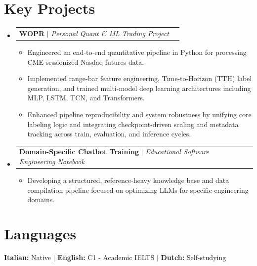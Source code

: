 \documentclass[letterpaper,10pt]{article}
\makeatletter
\newcommand{\resumeItem}[1]{
  \item\small{
    {#1 \vspace{-2pt}}
  }
}
\newcommand{\resumeProjectHeading}[2]{
    \item
    \begin{tabular*}{0.97\textwidth}{l@{\extracolsep{\fill}}r}
      \small#1 & #2 \\
    \end{tabular*}\vspace{-5pt}
}
\makeatother
\begin{document}
\section{Key Projects}
  \begin{itemize}[leftmargin=0.15in, label={}]
    \resumeProjectHeading
      {\textbf{WOPR} $|$ \emph{Personal Quant \& ML Trading Project}}{}
      \begin{itemize}
        \resumeItem{Engineered an end-to-end quantitative pipeline in 
        Python for processing CME sessionized Nasdaq futures data.}
        \resumeItem{Implemented range-bar feature engineering, 
        Time-to-Horizon (TTH) label generation, and trained multi-model 
        deep learning architectures including MLP, LSTM, TCN, and Transformers.}
        \resumeItem{Enhanced pipeline reproducibility and system robustness 
        by unifying core labeling logic and integrating checkpoint-driven 
        scaling and metadata tracking across train, evaluation, and 
        inference cycles.}
      \end{itemize}
    \resumeProjectHeading
      {\textbf{Domain-Specific Chatbot Training} $|$ \emph{Educational Software Engineering Notebook}}{}
      \begin{itemize}
        \resumeItem{Developing a structured, reference-heavy knowledge 
        base and data compilation pipeline focused on optimizing 
        LLMs for specific engineering domains.}
      \end{itemize}
  \end{itemize}

\section{Languages}
 \begin{itemize}[leftmargin=0.15in, label={}]
   \small{\item{
     \textbf{Italian:}{ Native} $|$ 
     \textbf{English:}{ C1 - Academic IELTS} $|$ 
     \textbf{Dutch:}{ Self-studying}
   }}
 \end{itemize}
\end{document}
